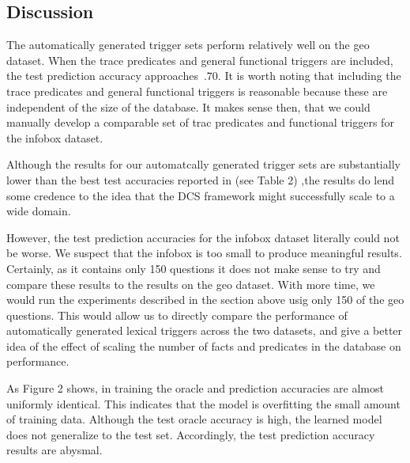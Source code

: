 \documentclass[11pt]{article}
\begin{document}
\subsection{Discussion}

The automatically generated trigger sets perform relatively well on the
{\sc geo} dataset. When the trace predicates and general functional triggers are
included, the test prediction accuracy approaches~$.70$. It is worth noting that 
including the trace predicates and general functional triggers is reasonable
because these are independent of the size of the database. It makes sense then,
that we could manually develop a comparable set of trac predicates and
functional triggers for the {\sc infobox} dataset. 

Although the results for our automatcally generated trigger sets
are substantially lower than the best test accuracies reported in
\cite{LThesis} (see Table 2) ,the results do lend some credence to 
the idea that the DCS framework might successfully scale to a wide domain. 

However, the test prediction accuracies for the {\sc infobox} dataset literally
could not be worse. We suspect that the {\sc infobox} is too small to produce
meaningful results. Certainly, as it contains only 150 questions it does not
make sense to try and compare these results to the results on the {\sc geo}
dataset. With more time, we would run the experiments described in the section
above usig only 150 of the {\sc geo} questions. This would allow us to directly
compare the performance of automatically generated lexical triggers across the
two datasets, and give a better idea of the effect of scaling the number of
facts and predicates in the database on performance.   

As Figure 2 shows, in training the oracle and prediction accuracies are
almost uniformly identical. This indicates that the model is overfitting the 
small amount of training data. Although the test oracle accuracy is high, the
learned model does not generalize to the test set. Accordingly, 
the test prediction accuracy results are abysmal.  
\end{document}
